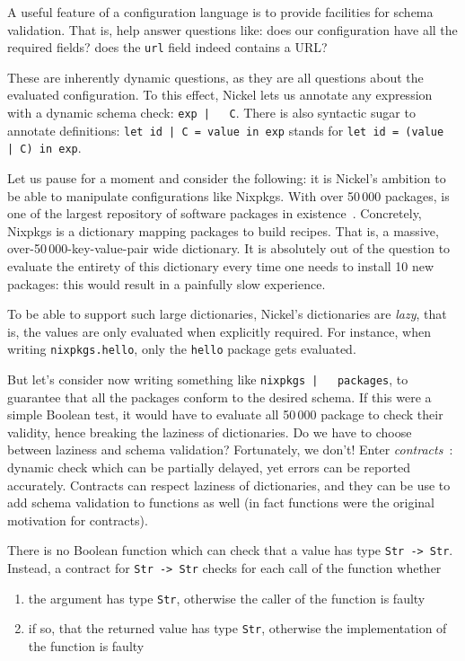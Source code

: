 \documentclass[sigplan,10pt,review,anonymous]{acmart}
\newcommand{\unsure}[2][1=]{}
\newcommand{\nickel}[1]{\lstinline[language=nickel]{#1}}
\begin{document}
A useful feature of a configuration language is to provide facilities
for schema validation. That is, help answer questions like: does our
configuration have all the required fields? does the \nickel{url} field indeed
contains a URL?

These are inherently dynamic questions, as they are all questions
about the evaluated configuration. To this effect, Nickel lets us
annotate any expression with a dynamic schema check: \nickel{exp |
  C}. There is also syntactic sugar to annotate definitions:
\nickel{let id | C = value in exp} stands for \nickel{let id = (value
  | C) in exp}.\unsure{This point used to be made, do we want to
  reinsert it? However, Nickel programs are of a special kind: they are usually
simple, terminating programs that run on fixed inputs. Correctness errors will
show up at evaluation anyway, or will not matter (dead code).}

Let us pause for a moment and consider the following: it is Nickel's
ambition to be able to manipulate configurations like Nixpkgs. With
over 50\,000 packages, is one of the largest repository of software
packages in existence~\cite{repology}. Concretely, Nixpkgs is a
dictionary mapping packages to build recipes. That is, a massive,
over-50\,000-key-value-pair wide dictionary. It is absolutely out of the
question to evaluate the entirety of this dictionary every time one
needs to install 10 new packages: this would result in a painfully
slow experience.

To be able to support such large dictionaries, Nickel's dictionaries
are \emph{lazy}, that is, the values are only evaluated when
explicitly required. For instance, when writing
\hbox{\nickel{nixpkgs.hello},} only the \nickel{hello} package gets
evaluated.

But let's consider now writing something like \nickel{nixpkgs |
  packages}, to guarantee that all the packages conform to the desired
schema. If this were a simple Boolean test, it would have to evaluate
all 50\,000 package to check their validity, hence breaking the
laziness of dictionaries. Do we have to choose between laziness and
schema validation? Fortunately, we don't! Enter
\emph{contracts}~\cite{FindlerFelleisenHOContracts}: dynamic check
which can be partially delayed, yet errors can be reported
accurately. Contracts can respect laziness of dictionaries, and they
can be use to add schema validation to functions as well (in fact
functions were the original motivation for contracts).

There is no Boolean function which can check that a value has type
\nickel{Str -> Str}. Instead, a contract for \nickel{Str -> Str}
checks for each call of the function whether
\begin{enumerate}
\item the argument has type \nickel{Str}, otherwise the caller of the
  function is faulty
\item if so, that the returned value has type \nickel{Str}, otherwise
  the implementation of the function is faulty
\end{enumerate}
\end{document}
